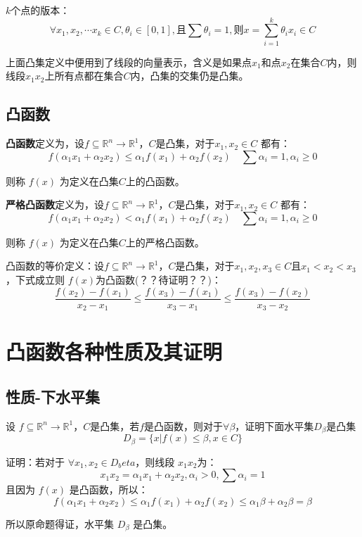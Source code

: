 \documentclass[12pt]{article}
\begin{document}
$k$个点的版本：
$$
\forall x_1, x_2, \cdots x_k \in C, \theta_i \in [0,1], \text{且} \sum\theta_i = 1, \text{则} x = \sum_{i=1}^k\theta_ix_i \in C
$$

上面凸集定义中便用到了线段的向量表示，含义是如果点$x_1$和点$x_2$在集合$C$内，则线段$x_1x_2$上所有点都在集合$C$内，凸集的交集仍是凸集。

\subsection{凸函数}
\textbf{凸函数}定义为，设$f \subseteq \mathbb{R}^n \to \mathbb{R}^1$，$C$是凸集，对于$x_1, x_2 \in C$ 都有：
$$
f(\alpha_1x_1 + \alpha_2x_2) \le \alpha_1f(x_1) + \alpha_2f(x_2) \quad \sum\alpha_i = 1, \alpha_i \ge 0
$$

则称 $f(x)$ 为定义在凸集$C$上的凸函数。

\textbf{严格凸函数}定义为，设$f \subseteq \mathbb{R}^n \to \mathbb{R}^1$，$C$是凸集，对于$x_1, x_2 \in C$ 都有：
$$
f(\alpha_1x_1 + \alpha_2x_2) < \alpha_1f(x_1) + \alpha_2f(x_2) \quad \sum\alpha_i = 1, \alpha_i \ge 0
$$

则称 $f(x)$ 为定义在凸集$C$上的严格凸函数。

凸函数的等价定义：设$f \subseteq \mathbb{R}^n \to \mathbb{R}^1$，$C$是凸集，对于$x_1, x_2, x_3 \in C $且$x_1<x_2<x_3$，下式成立则 $f(x)$为凸函数(？？待证明？？)：
$$
\frac{f(x_2) - f(x_1)}{x_2 - x_1} \le \frac{f(x_3) - f(x_1)}{x_3 - x_1} \le \frac{f(x_3) - f(x_2)}{x_3 - x_2}
$$

\section{凸函数各种性质及其证明}
\subsection{性质-下水平集}
设 $f \subseteq \mathbb{R}^n \to \mathbb{R}^1$，$C$是凸集，若$f$是凸函数，则对于$\forall\beta$，证明下面水平集$D_\beta$是凸集
$$
D_\beta = \{x|f(x) \le \beta, x \in C\}
$$
\begin{framed}  
\small{
证明：若对于 $\forall x_1,x_2 \in D_beta$，则线段 $x_1x_2$为：
$$
    x_1x_2 = \alpha_1x_1 + \alpha_2x_2, \alpha_i > 0, \sum\alpha_i = 1
$$
且因为 $f(x)$ 是凸函数，所以：
$$
f(\alpha_1x_1 + \alpha_2x_2) \le \alpha_1f(x_1) + \alpha_2f(x_2) \le \alpha_1\beta + \alpha_2\beta = \beta
$$

所以原命题得证，水平集 $D_\beta$ 是凸集。
}
\end{framed}
\end{document}
